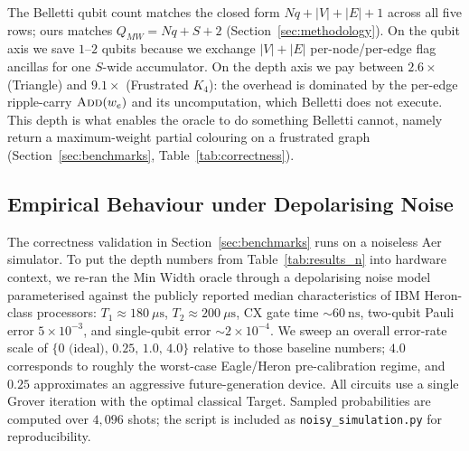 \documentclass{ieeeaccess}
\begin{document}
The Belletti qubit count matches the closed form $Nq + |V| + |E| + 1$ across all five rows; ours matches $Q_{MW} = Nq + S + 2$ (Section~\ref{sec:methodology}). On the qubit axis we save $1$--$2$ qubits because we exchange $|V|+|E|$ per-node/per-edge flag ancillas for one $S$-wide accumulator. On the depth axis we pay between $2.6\times$ (Triangle) and $9.1\times$ (Frustrated $K_4$): the overhead is dominated by the per-edge ripple-carry $\textsc{Add}(w_e)$ and its uncomputation, which Belletti does not execute. This depth is what enables the oracle to do something Belletti cannot, namely return a maximum-weight partial colouring on a frustrated graph (Section~\ref{sec:benchmarks}, Table~\ref{tab:correctness}).


\subsection{Empirical Behaviour under Depolarising Noise}
\label{sec:noise_sweep}

The correctness validation in Section~\ref{sec:benchmarks} runs on a noiseless Aer simulator. To put the depth numbers from Table~\ref{tab:results_n} into hardware context, we re-ran the Min Width oracle through a depolarising noise model parameterised against the publicly reported median characteristics of IBM Heron-class processors: $T_1 \approx 180~\mu\mathrm{s}$, $T_2 \approx 200~\mu\mathrm{s}$, CX gate time $\sim 60~\mathrm{ns}$, two-qubit Pauli error $5\times 10^{-3}$, and single-qubit error $\sim 2 \times 10^{-4}$. We sweep an overall error-rate scale of $\{0\text{ (ideal)},\,0.25,\,1.0,\,4.0\}$ relative to those baseline numbers; $4.0$ corresponds to roughly the worst-case Eagle/Heron pre-calibration regime, and $0.25$ approximates an aggressive future-generation device. All circuits use a single Grover iteration with the optimal classical Target. Sampled probabilities are computed over $4{,}096$ shots; the script is included as \texttt{noisy\_simulation.py} for reproducibility.

\begin{table}[htbp]
\caption{Min Width Oracle: $P(\text{measure optimal coloring})$ vs.\ Depolarising Noise Scale}
\label{tab:noisy}
\centering
{}
\end{table}
\end{document}
